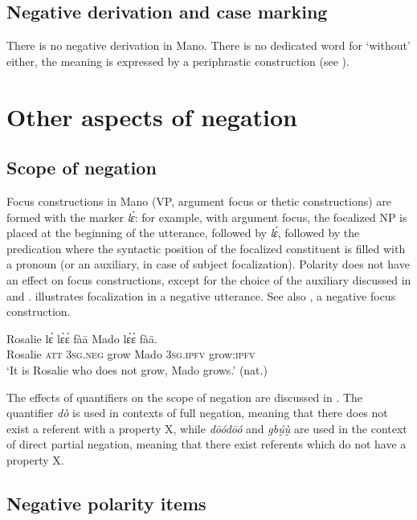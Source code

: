 \documentclass[output=paper,colorlinks,citecolor=brown]{langscibook}
\begin{document}
\subsection{Negative derivation and case marking}\label{sec:mano:3.3}

There is no negative derivation in Mano. There is no dedicated word for ‘without’ either, the meaning is expressed by a periphrastic construction (see ).

\section{Other aspects of negation}\label{sec:mano:4}

\subsection{Scope of negation}\label{sec:mano:4.1}

Focus constructions in Mano (VP, argument focus or thetic constructions) are formed with the marker \textit{lɛ́}: for example, with argument focus, the focalized NP is placed at the beginning of the utterance, followed by \textit{lɛ́}, followed by the predication where the syntactic position of the focalized constituent is filled with a pronoun (or an auxiliary, in case of subject focalization). Polarity does not have an effect on focus constructions, except for the choice of the auxiliary discussed in  and .  illustrates focalization in a negative utterance. See also , a negative focus construction.

\ea\label{ex:mano:80}
    \gll Rosalie lɛ́ lɛ̀ɛ́ fàā Mado lɛ́ɛ̀ fàā. \\
         Rosalie  \textsc{att} \textsc{3sg.neg} grow Mado \textsc{3sg.ipfv} grow:\textsc{ipfv}\\
    \glt ‘It is Rosalie who does not grow, Mado grows.’ (nat.)
\z

The effects of quantifiers on the scope of negation are discussed in . The quantifier \textit{dò} is used in contexts of full negation, meaning that there does not exist a referent with a property X, while \textit{dōódōó} and \textit{gbṵ́ṵ̀} are used in the context of direct partial negation, meaning that there exist referents which do not have a property X.


\subsection{Negative polarity items}\label{sec:mano:4.2}
\end{document}
